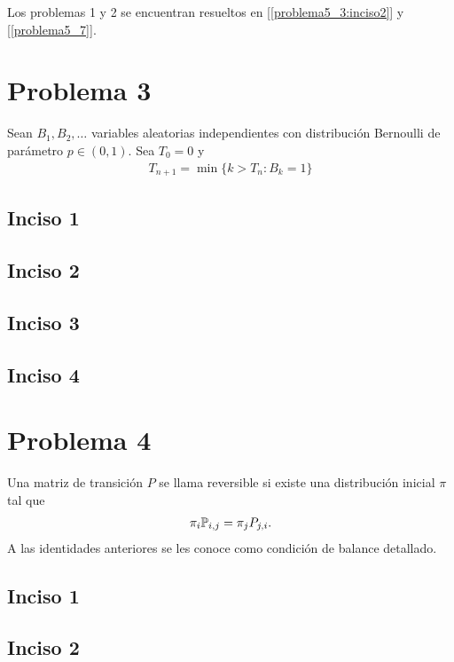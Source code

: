 Los problemas 1 y 2 se encuentran resueltos en [\ref{problema5_3:inciso2}] y [\ref{problema5_7}].

\section{Problema 3}
Sean $B_1, B_2, \dots$ variables aleatorias independientes con distribución Bernoulli de parámetro $p \in (0,1)$.
Sea $T_0 = 0$ y
\begin{align}
    T_{n+1} = \min\{k>T_n : B_k = 1\}
\end{align}
    \subsection{Inciso 1}
        
        \newpage
        
    \subsection{Inciso 2}
        
        \newpage
        
    \subsection{Inciso 3}
        
        \newpage
        
    \subsection{Inciso 4}
        
        
\section{Problema 4}
Una matriz de transición $P$ se llama reversible si existe una distribución inicial $\pi$ tal que
\begin{align}
    \pi_i \P_{i,j} = \pi_j P_{j,i}.
\end{align}
A las identidades anteriores se les conoce como condición de balance detallado.
    \subsection{Inciso 1}
        
        \newpage
        
    \subsection{Inciso 2}
        
        \newpage
        
